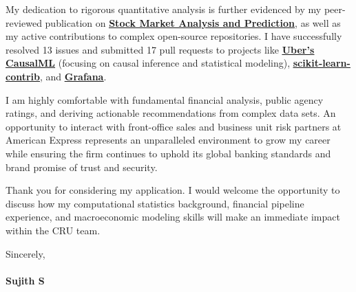 \documentclass[a4paper,11pt]{article}
\newcommand{\ulink}[2]{\href{#1}{\uline{#2}}}
\begin{document}
My dedication to rigorous quantitative analysis is further evidenced by my peer-reviewed publication on \ulink{https://www.elruha.org/_files/ugd/614b1f_6b95e1b697bf452b9907ba46e0151c05.pdf\#page=774}{\textbf{Stock Market Analysis and Prediction}}, as well as my active contributions to complex open-source repositories. I have successfully resolved 13 issues and submitted 17 pull requests to projects like \ulink{https://github.com/uber/causalml}{\textbf{Uber's CausalML}} (focusing on causal inference and statistical modeling), \ulink{https://github.com/scikit-learn-contrib/forest-confidence-interval}{\textbf{scikit-learn-contrib}}, and \ulink{https://github.com/grafana/alloy-scenarios}{\textbf{Grafana}}.

I am highly comfortable with fundamental financial analysis, public agency ratings, and deriving actionable recommendations from complex data sets. An opportunity to interact with front-office sales and business unit risk partners at American Express represents an unparalleled environment to grow my career while ensuring the firm continues to uphold its global banking standards and brand promise of trust and security.

Thank you for considering my application. I would welcome the opportunity to discuss how my computational statistics background, financial pipeline experience, and macroeconomic modeling skills will make an immediate impact within the CRU team.

Sincerely, \\
\vspace{5pt} \\
\textbf{Sujith S}
\end{document}
